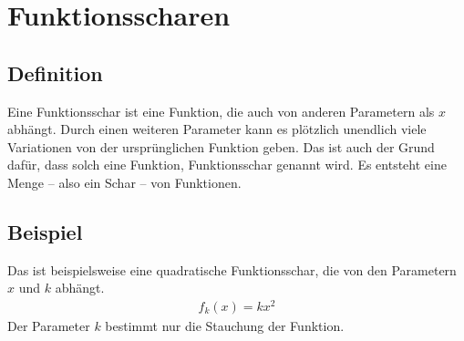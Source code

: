 \chapter{Funktionsscharen}

\section{Definition}
\begin{flushleft}
    Eine Funktionsschar ist eine Funktion, die auch von anderen Parametern als $x$ abhängt.
    Durch einen weiteren Parameter kann es plötzlich unendlich viele Variationen von der ursprünglichen Funktion geben.
    Das ist auch der Grund dafür, dass solch eine Funktion, Funktionsschar genannt wird.
    Es entsteht eine Menge -- also ein Schar -- von Funktionen.
\end{flushleft}

\section{Beispiel}
\begin{flushleft}
    Das ist beispielsweise eine quadratische Funktionsschar, die von den Parametern $x$ und $k$ abhängt.
    \begin{align}
        f_k(x)=kx^2
    \end{align}
    Der Parameter $k$ bestimmt nur die Stauchung der Funktion.
\end{flushleft}

\begin{center}
\end{center}
